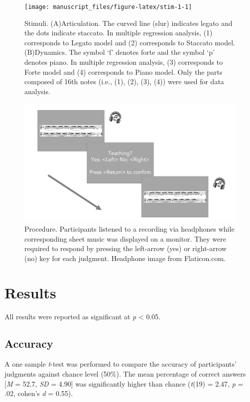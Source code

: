 \documentclass[
  man,floatsintext]{apa6}
\begin{document}
\begin{figure}
\texttt{[image: manuscript\_files/figure-latex/stim-1-1]} \caption{\label{fig:stim1}Stimuli. (A)Articulation. The curved line (slur) indicates legato and the dots indicate staccato. In multiple regression analysis, (1) corresponds to Legato model and (2) corresponds to Staccato model. (B)Dynamics. The symbol `f' denotes forte and the symbol `p' denotes piano. In multiple regression analysis, (3) corresponds to Forte model and (4) corresponds to Piano model. Only the parts composed of 16th notes (i.e., (1), (2), (3), (4)) were used for data analysis.}\label{fig:stim-1}
\end{figure}

\begin{figure}

{\centering \includegraphics[width=0.5\linewidth]{image/procedure} 

}

\caption{\label{fig:procedure1}Procedure. Participants listened to a recording via headphones while corresponding sheet music was displayed on a monitor. They were required to respond by pressing the left-arrow (yes) or right-arrow (no) key for each judgment. Headphone image from Flaticon.com.}\label{fig:procedure-1}
\end{figure}

\clearpage

\hypertarget{results}{%
\section{Results}\label{results}}

All results were reported as significant at \emph{p} \textless{} 0.05.

\hypertarget{accuracy-1}{%
\subsection{Accuracy}\label{accuracy-1}}

A one sample \emph{t}-test was performed to compare the accuracy of participants' judgments against chance level (50\%). The mean percentage of correct answers {[}\emph{M} = 52.7, \emph{SD} = 4.90{]} was significantly higher than chance (\emph{t}(19) = 2.47, \emph{p} = .02, cohen's \emph{d} = 0.55).
\end{document}
